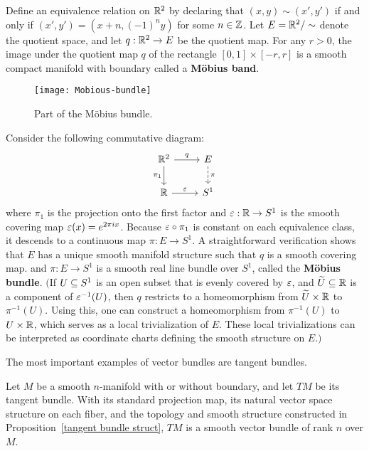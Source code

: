 \begin{example}\label{Mobius bundle}
Define an equivalence relation on $\mathbb{R}^2$ by declaring that $(x,y)\sim(x',y')$ if and only if $(x',y')=(x+n,(-1)^ny)$ for some $n\in\mathbb{Z}$. Let $E=\mathbb{R}^2/\sim$ denote the quotient space, and let $q:\mathbb{R}^2\to E$ be the quotient map. For any $r>0$, the image under the quotient map $q$ of the rectangle $[0,1]\times[-r,r]$ is a smooth compact manifold with boundary called a \textbf{M\"obius band}.
\begin{figure}[htbp]
\centering
\texttt{[image: Mobious-bundle]}
\caption{Part of the Möbius bundle.}
\end{figure}\par
Consider the following commutative diagram:
\[\begin{tikzcd}
\R^2\ar[r,"q"]\ar[d,swap,"\pi_1"]&E\ar[d,dashed,"\pi"]\\
\R\ar[r,"\eps"]&S^1
\end{tikzcd}\]
where $\pi_1$ is the projection onto the first factor and $\varepsilon:\mathbb{R}\to S^1$ is the smooth covering map $\varepsilon(x)=e^{2\pi ix}$. Because $\varepsilon\circ\pi_1$ is constant on each equivalence class, it descends to a continuous map $\pi:E\to S^1$. A straightforward verification shows that $E$ has a unique smooth manifold structure such that $q$ is a smooth covering map. and $\pi:E\to S^1$ is a smooth real line bundle over $S^1$, called the \textbf{M\"obius bundle}. $($If $U\subseteq S^1$ is an open subset that is evenly covered by $\varepsilon$, and $\widetilde{U}\subseteq\mathbb{R}$ is a component of $\varepsilon^{-1}(U)$, then $q$ restricts to a homeomorphism from $\widetilde{U}\times\mathbb{R}$ to $\pi^{-1}(U)$. Using this, one can construct a homeomorphism from $\pi^{-1}(U)$ to $U\times\mathbb{R}$, which serves as a local trivialization of $E$. These local trivializations can be interpreted as coordinate charts defining the smooth structure on $E$.$)$
\end{example}
The most important examples of vector bundles are tangent bundles.
\begin{proposition}\label{tangent bundle as vector bundle}
Let $M$ be a smooth $n$-manifold with or without boundary, and let $TM$ be its tangent bundle. With its standard projection map, its natural vector space structure on each fiber, and the topology and smooth structure constructed in Proposition~\ref{tangent bundle struct}, $TM$ is a smooth vector bundle of rank $n$ over $M$.
\end{proposition}
